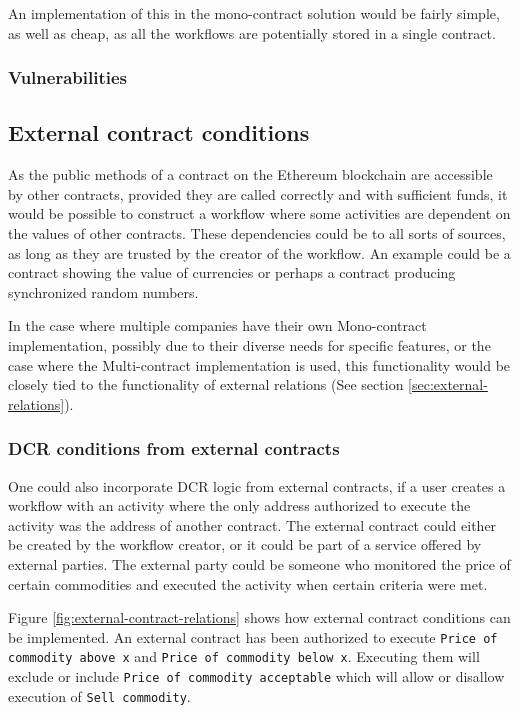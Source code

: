 \documentclass{article}
\begin{document}
		An implementation of this in the mono-contract solution would be fairly simple, as well as cheap, as all the workflows are potentially stored in a single contract.

		\subsubsection{Vulnerabilities}

		\subsection{External contract conditions}
		As the public methods of a contract on the Ethereum blockchain are accessible by other contracts, provided they are called correctly and with sufficient funds, it would be possible to construct a workflow where some activities are dependent on the values of other contracts.
		These dependencies could be to all sorts of sources, as long as they are trusted by the creator of the workflow. 
		An example could be a contract showing the value of currencies or perhaps a contract producing synchronized random numbers.

		In the case where multiple companies have their own Mono-contract implementation, possibly due to their diverse needs for specific features, or the case where the Multi-contract implementation is used, this functionality would be closely tied to the functionality of external relations (See section \ref{sec:external-relations}).
		\subsubsection{DCR conditions from external contracts}
		One could also incorporate DCR logic from external contracts, if a user creates a workflow with an activity where the only address authorized to execute the activity was the address of another contract.
		The external contract could either be created by the workflow creator, or it could be part of a service offered by external parties.
		The external party could be someone who monitored the price of certain commodities and executed the activity when certain criteria were met.
		
		Figure \ref{fig:external-contract-relations} shows how external contract conditions can be implemented. 
		An external contract has been authorized to execute \texttt{Price of commodity above x} and \texttt{Price of commodity below x}. 
		Executing them will exclude or include \texttt{Price of commodity acceptable} which will allow or disallow execution of \texttt{Sell commodity}.
		
\end{document}

